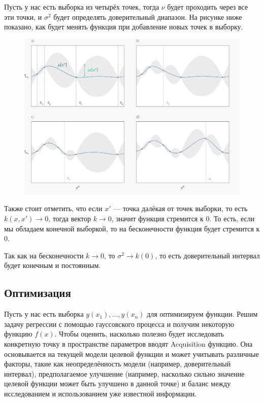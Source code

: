 \documentclass[a4paper,14pt]{extarticle}
\begin{document}
		Пусть у нас есть выборка из четырёх точек, тогда $\nu$ будет проходить через все эти точки, и $\sigma^2$ будет определять доверительный диапазон. На рисунке ниже показано, как будет менять функция при добавление новых точек в выборку. 
		\begin{figure}[H]
			\includegraphics[scale=0.15]{p1}
		\end{figure}
	
		Также стоит отметить, что если $x'$ --- точка далёкая от точек выборки, то есть $k(x, x') \rightarrow 0$, тогда вектор $k \rightarrow 0$, значит функция стремится к 0. То есть, если мы обладаем конечной выборкой, то на бесконечности функция будет стремится к 0. 
		
		Так как на бесконечности $k \rightarrow 0$, то 	$\sigma^2 \rightarrow k(0)$, то есть доверительный интервал будет конечным и постоянным. 
		
		\subsection{Оптимизация}
		Пусть у нас есть выборка $y(x_1), \ldots, y(x_n)$ для оптимизируем функции. Решим задачу регрессии с помощью гауссовского процесса и получим некоторую функцию $f(x)$. Чтобы оценить,  насколько полезно будет исследовать конкретную точку в пространстве параметров вводят Acquisition функцию. Она основывается на текущей модели целевой функции и может учитывать различные факторы, такие как неопределённость модели (например, доверительный интервал), предполагаемое улучшение (например, насколько сильно значение целевой функции может быть улучшено в данной точке) и баланс между исследованием и использованием уже известной информации. 
		
\end{document}
